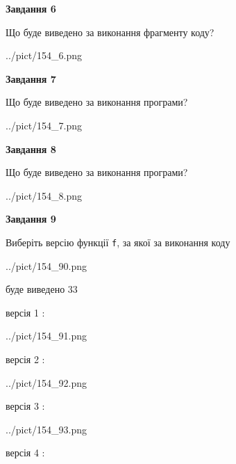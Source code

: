 \documentclass[12pt, ukrainian]{article}
\def\code#1{\Verb!#1!}
\begin{document}
{\begin {large}
{\begin {center}\textbf{Завдання 6}\end {center}}

Що буде виведено за виконання фрагменту коду?\par
\begin{center}
	{../pict/154_6.png}
\end{center}
\newpage

{\begin {center}\textbf{Завдання 7}\end {center}}

Що буде виведено за виконання програми?\par
\begin{center}
	{../pict/154_7.png}
\end{center}
\newpage

{\begin {center}\textbf{Завдання 8}\end {center}}

Що буде виведено за виконання програми?\par
\begin{center}
	{../pict/154_8.png}
\end{center}
\newpage

{\begin {center}\textbf{Завдання 9}\end {center}}

Виберіть версію функції \code{f}, за якої за виконання коду
\begin{center}
	{../pict/154_90.png}
\end{center}
буде виведено 33

\vspace{5mm}
версія 1 :

\begin{center}
	{../pict/154_91.png}
\end{center}
версія 2 :

\begin{center}
	{../pict/154_92.png}
\end{center}
версія 3 :

\begin{center}
	{../pict/154_93.png}
\end{center}
версія 4 :


\end{large}}
\end{document}

